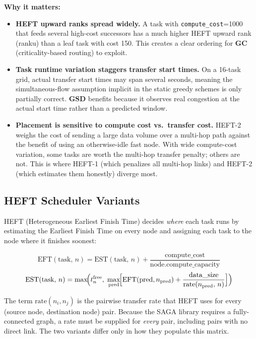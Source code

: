 \documentclass[11pt]{article}
\begin{document}
\medskip
\textbf{Why it matters:}
\begin{itemize}
  \item \textbf{HEFT upward ranks spread widely.}  A task with
        \texttt{compute\_cost}=1000 that feeds several high-cost
        successors has a much higher HEFT upward rank (ranku) than a
        leaf task with cost 150.  This creates a clear ordering for
        \textbf{GC} (criticality-based routing) to exploit.
  \item \textbf{Task runtime variation staggers transfer start times.}
        On a 16-task grid, actual transfer start times may span several
        seconds, meaning the simultaneous-flow assumption implicit in the
        static greedy schemes is only partially correct.  \textbf{GSD}
        benefits because it observes real congestion at the actual start
        time rather than a predicted window.
  \item \textbf{Placement is sensitive to compute cost vs.\ transfer cost.}
        HEFT-2 weighs the cost of sending a large data volume over a
        multi-hop path against the benefit of using an otherwise-idle
        fast node.  With wide compute-cost variation, some tasks are
        worth the multi-hop transfer penalty; others are not.  This is
        where HEFT-1 (which penalizes all multi-hop links) and HEFT-2
        (which estimates them honestly) diverge most.
\end{itemize}

\subsection{HEFT Scheduler Variants}

HEFT (Heterogeneous Earliest Finish Time) decides \emph{where} each task runs
by estimating the Earliest Finish Time on every node and assigning each task
to the node where it finishes soonest:

\[
  \mathrm{EFT}(\text{task},\, n)
  = \mathrm{EST}(\text{task},\, n)
  + \frac{\text{compute\_cost}}{\text{node.compute\_capacity}}
\]
\[
  \mathrm{EST}(\text{task},\, n)
  = \max\!\Bigl(
      t_n^{\text{free}},\;
      \max_{\text{pred}}\!\Bigl[
        \mathrm{EFT}(\text{pred}, n_{\text{pred}})
        + \frac{\text{data\_size}}{\text{rate}(n_{\text{pred}},\, n)}
      \Bigr]
    \Bigr)
\]

The term $\text{rate}(n_i, n_j)$ is the pairwise transfer rate that HEFT uses
for every (source node, destination node) pair.  Because the SAGA library
requires a fully-connected graph, a rate must be supplied for \emph{every}
pair, including pairs with no direct link.  The two variants differ only in
how they populate this matrix.
\end{document}

